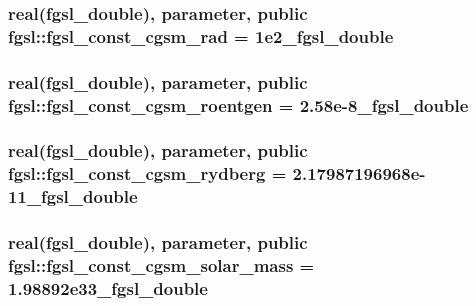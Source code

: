 \subsubsection[{fgsl\+\_\+const\+\_\+cgsm\+\_\+rad}]{\setlength{\rightskip}{0pt plus 5cm}real({\bf fgsl\+\_\+double}), parameter, public fgsl\+::fgsl\+\_\+const\+\_\+cgsm\+\_\+rad = 1e2\+\_\+fgsl\+\_\+double}\label{namespacefgsl_aa616f1f47c1a107f10dcb7418517b723}
\hypertarget{namespacefgsl_a081808c3b3b7297c71e015034c089d04}{}
\subsubsection[{fgsl\+\_\+const\+\_\+cgsm\+\_\+roentgen}]{\setlength{\rightskip}{0pt plus 5cm}real({\bf fgsl\+\_\+double}), parameter, public fgsl\+::fgsl\+\_\+const\+\_\+cgsm\+\_\+roentgen = 2.\+58e-\/8\+\_\+fgsl\+\_\+double}\label{namespacefgsl_a081808c3b3b7297c71e015034c089d04}
\hypertarget{namespacefgsl_a0f2cb7b75a4fd58c54e5a0b794da13b6}{}
\subsubsection[{fgsl\+\_\+const\+\_\+cgsm\+\_\+rydberg}]{\setlength{\rightskip}{0pt plus 5cm}real({\bf fgsl\+\_\+double}), parameter, public fgsl\+::fgsl\+\_\+const\+\_\+cgsm\+\_\+rydberg = 2.\+17987196968e-\/11\+\_\+fgsl\+\_\+double}\label{namespacefgsl_a0f2cb7b75a4fd58c54e5a0b794da13b6}
\hypertarget{namespacefgsl_a41afd20c5be47db2d713c42cac018572}{}
\subsubsection[{fgsl\+\_\+const\+\_\+cgsm\+\_\+solar\+\_\+mass}]{\setlength{\rightskip}{0pt plus 5cm}real({\bf fgsl\+\_\+double}), parameter, public fgsl\+::fgsl\+\_\+const\+\_\+cgsm\+\_\+solar\+\_\+mass = 1.\+98892e33\+\_\+fgsl\+\_\+double}\label{namespacefgsl_a41afd20c5be47db2d713c42cac018572}
\hypertarget{namespacefgsl_a5b4812e235747b48af51d2e576dfa469}{}
